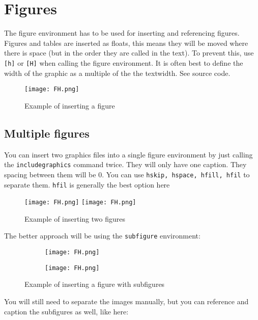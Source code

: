 \section{Figures}
\label{sec:Figures}
The figure environment has to be used for inserting and referencing figures. Figures and tables are inserted as floats, this means they will be moved where there is space (but in the order they are called in the text). To prevent this, use \texttt{[h]} or \texttt{[H]} when calling the figure environment.
It is often best to define the width of the graphic as a multiple of the the textwidth.
See source code.
\begin{figure}[h]
	\centering
	\texttt{[image: FH.png]}
	\caption{Example of inserting a figure}
	\label{fig:ExampleFigure-1}
\end{figure}

\subsection{Multiple figures}
You can insert two graphics files into a single figure environment by just calling the \texttt{includegraphics} command twice. They will only have one caption. They spacing between them will be 0. You can use \texttt{hskip, hspace, hfill, hfil} to separate them. \texttt{hfil} is generally the best option here

\begin{figure}[h]
    \centering
    \texttt{[image: FH.png]}
    \hfil
    \texttt{[image: FH.png]}
    \caption{Example of inserting two figures}
    \label{fig:ExampleFigure-2}
\end{figure}

The better approach will be using the \texttt{subfigure} environment:

\begin{figure}[h]
    \centering
    \begin{subfigure}{0.4\textwidth}
        \centering
        \texttt{[image: FH.png]}
    \end{subfigure}
    \hfil
    \begin{subfigure}{0.4\textwidth}
        \centering
        \texttt{[image: FH.png]}
    \end{subfigure}
    \caption{Example of inserting a figure with subfigures}
    \label{fig:ExampleFigure-3}
\end{figure}

You will still need to separate the images manually, but you can reference and caption the subfigures as well, like here:



